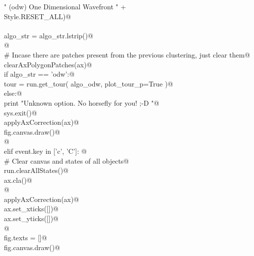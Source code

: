 \documentclass[10pt, english, oneside]{report}
\begin{document}
\begin{appendices}
\begin{flushleft}
\begin{list}{}{}
\mbox{}\verb@                            " (odw)     One Dimensional Wavefront \n"                            +\@\\
\mbox{}\verb@                            Style.RESET_ALL)@\\
\mbox{}\verb@@\\
\mbox{}\verb@                    algo_str = algo_str.lstrip()@\\
\mbox{}\verb@                     @\\
\mbox{}\verb@                    # Incase there are patches present from the previous clustering, just clear them@\\
\mbox{}\verb@                    clearAxPolygonPatches(ax)@\\
\mbox{}\verb@                    if   algo_str == 'odw':@\\
\mbox{}\verb@                          tour = run.get_tour( algo_odw, plot_tour_p=True )@\\
\mbox{}\verb@                    else:@\\
\mbox{}\verb@                          print "Unknown option. No horsefly for you! ;-D "@\\
\mbox{}\verb@                          sys.exit()@\\
\mbox{}\verb@                    applyAxCorrection(ax)@\\
\mbox{}\verb@                    fig.canvas.draw()@\\
\mbox{}\verb@                    @\\
\mbox{}\verb@               elif event.key in ['c', 'C']: @\\
\mbox{}\verb@                    # Clear canvas and states of all objects@\\
\mbox{}\verb@                    run.clearAllStates()@\\
\mbox{}\verb@                    ax.cla()@\\
\mbox{}\verb@                                  @\\
\mbox{}\verb@                    applyAxCorrection(ax)@\\
\mbox{}\verb@                    ax.set_xticks([])@\\
\mbox{}\verb@                    ax.set_yticks([])@\\
\mbox{}\verb@                                     @\\
\mbox{}\verb@                    fig.texts = []@\\
\mbox{}\verb@                    fig.canvas.draw()@\\

\end{list}
\end{flushleft}
\end{appendices}
\end{document}
